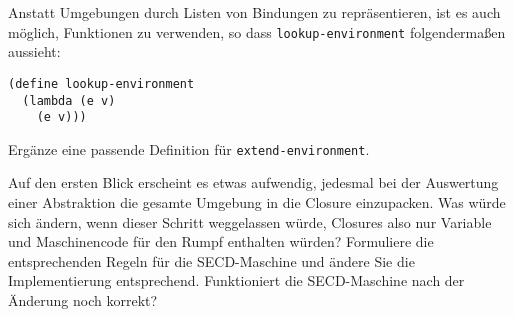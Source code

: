 \begin{aufgabe}
  Anstatt Umgebungen durch Listen von Bindungen zu repräsentieren, ist
  es auch möglich, Funktionen zu verwenden, so dass
  \texttt{lookup-environment} folgendermaßen aussieht:
\begin{verbatim}
(define lookup-environment
  (lambda (e v)
    (e v)))
\end{verbatim}
  Ergänze eine passende Definition für
  \texttt{extend-environment}.
\end{aufgabe}

\begin{aufgabe}
  Auf den ersten Blick erscheint es etwas aufwendig, jedesmal bei der
  Auswertung einer Abstraktion die gesamte Umgebung in die Closure
  einzupacken.  Was würde sich ändern, wenn dieser Schritt weggelassen
  würde, Closures also nur Variable und Maschinencode für den Rumpf
  enthalten würden?  Formuliere die entsprechenden Regeln für die
  SECD-Maschine und ändere Sie die Implementierung entsprechend.
  Funktioniert die SECD-Maschine nach der Änderung noch korrekt?
\end{aufgabe}


